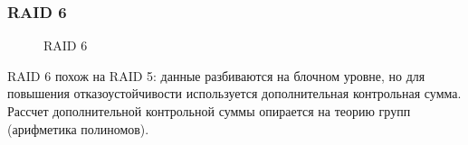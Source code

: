 \begin{frame}
    \frametitle{RAID 6}
    
    \begin{figure}
        \begin{center}
            \caption{RAID 6}\label{pict:raid6}
        \end{center}
    \end{figure} 
\end{frame}

RAID 6 похож на RAID 5: данные разбиваются на блочном уровне, но для повышения отказоустойчивости используется дополнительная контрольная сумма. Рассчет дополнительной контрольной суммы опирается на теорию групп (арифметика полиномов).

